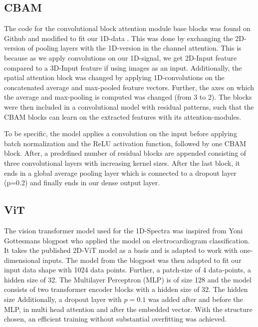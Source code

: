 \subsection{CBAM}
The code for the convolutional block attention module base blocks was found on Github and modified to fit our 1D-data \cite{mazzia__2023}. This was done by exchanging the 2D-version of pooling layers with the 1D-version in the channel attention. This is because as we apply convolutions on our 1D-signal, we get 2D-Input feature compared to a 3D-Input feature if using images as an input. Additionally, the spatial attention block was changed by applying 1D-convolutions on the concatenated average and max-pooled feature vectors. Further, the axes on which the average and max-pooling is computed was changed (from 3 to 2).
The blocks were then included in a convolutional model with residual patterns, such that the CBAM blocks can learn on the extracted features with its attention-modules. 

To be specific, the model applies a convolution on the input before applying batch normalization and the ReLU activation function, followed by one CBAM block. After, a predefined number of residual blocks are appended consisting of three convolutional layers with increasing kernel sizes.
After the last block, it ends in a global average pooling layer which is connected to a dropout layer (p=0.2) and finally ends in our dense output layer.

\subsection{ViT}
The vision transformer model used for the 1D-Spectra was inspired from Yoni Gottesmans blogpost \cite{noauthor_interpretable_2023} who applied the model on electrocardiogram classification. 
It takes the published 2D-ViT model \cite{dosovitskiy_image_2021}as a basis and is adapted to work with one-dimensional inputs.
The model from the blogpost was then adapted to fit our input data shape with 1024 data points. Further, a patch-size of 4 data-points, a hidden size of 32. The Multilayer Perceptron (MLP) is of size 128 and the model consists of two transformer encoder blocks with a hidden size of 32. The hidden size  Additionally, a dropout layer with $p=0.1$ was added after and before the MLP, 
in multi head attention and after the embedded vector.
With the structure chosen, an efficient training without substantial overfitting was achieved. 


